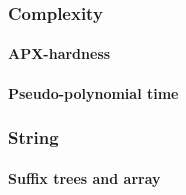 	\subsubsection{Complexity}
		\paragraph{APX-hardness}
		\paragraph{Pseudo-polynomial time}

	\subsubsection{String}
		\paragraph{Suffix trees and array}

